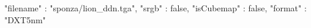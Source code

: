 { 
	"filename" : "sponza/lion_ddn.tga", 
	"srgb" : false,
	"isCubemap" : false,
	"format" : "DXT5nm"
}